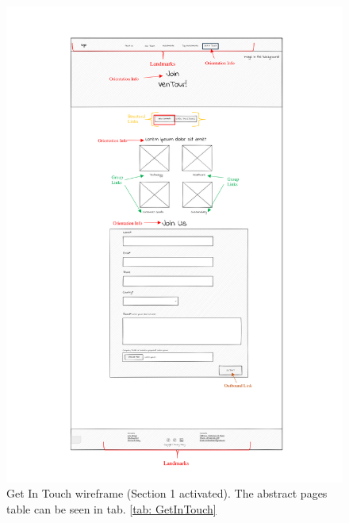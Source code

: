  \begin{figure}[!htb]
     \centering
     \includegraphics[width=\textwidth]{Images/Wireframes/JoinUS-2.png}
     \caption{Get In Touch wireframe (Section 1 activated). The abstract pages table can be seen in tab. \ref{tab: GetInTouch}}
     \label{fig:getintouch-wireframe2}
 \end{figure}
 
 \clearpage